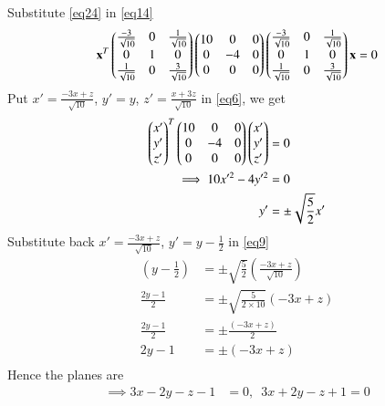 \documentclass[journal,12pt,twocolumn]{IEEEtran}
\begin{document}
Substitute \eqref{eq24} in \eqref{eq14}
{\small\begin{align}\label{eq6}
	\mathbf{x}^T\begin{pmatrix}\frac{-3}{\sqrt{10}} & 0 & \frac{1}{\sqrt{10}}\\ 0 & 1 & 0\\ \frac{1}{\sqrt{10}} & 0 & \frac{3}{\sqrt{10}}\end{pmatrix} \begin{pmatrix}10 & 0 & 0\\0 & -4 & 0\\0 & 0 &0\end{pmatrix}\begin{pmatrix}\frac{-3}{\sqrt{10}} & 0 & \frac{1}{\sqrt{10}}\\ 0 & 1 & 0\\ \frac{1}{\sqrt{10}} & 0 & \frac{3}{\sqrt{10}}\end{pmatrix}\mathbf{x} = 0
\end{align}}
Put $x'=\frac{-3x+z}{\sqrt{10}}$, $y'=y$, $z'=\frac{x+3z}{\sqrt{10}}$ in \eqref{eq6}, we get
\begin{align}
	\begin{pmatrix}x' \\y'\\z'\end{pmatrix}^T \begin{pmatrix}10 & 0 & 0\\0 & -4 & 0\\0 & 0 &0\end{pmatrix} \begin{pmatrix}x' \\y'\\z'\end{pmatrix} &= 0\\
	\implies 10x'^2 - 4y'^2 &= 0\\
	\label{eq9}y' &= \pm \sqrt{\frac{5}{2}} x'
\end{align}
Substitute back $x'=\frac{-3x+z}{\sqrt{10}}$, $y'=y-\frac{1}{2}$ in \eqref{eq9}
\begin{align}
	\left(y-\frac{1}{2}\right) &= \pm \sqrt{\frac{5}{2}} \left(\frac{-3x+z}{\sqrt{10}}\right)\\
	\frac{2y-1}{2} &= \pm \sqrt{\frac{5}{2 \times 10}} (-3x+z)\\
	\frac{2y-1}{2} &= \pm \frac{(-3x+z)}{2}\\
	2y-1 &= \pm (-3x+z)\\
\end{align}
Hence the planes are
\begin{align}
	\implies 3x -2y - z -1 &=0,\enspace 3x +2y -z +1 = 0
\end{align}
\end{document}
